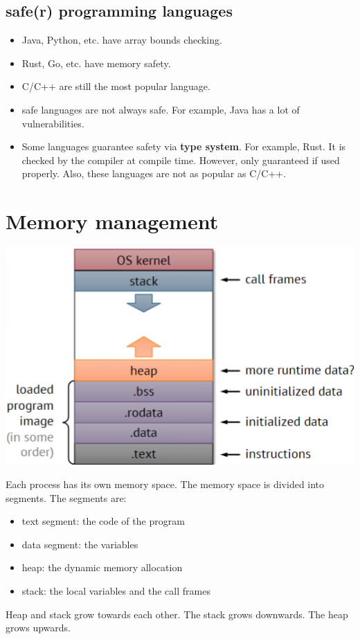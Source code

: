 \documentclass[letterpaper,12pt]{article}
\begin{document}
\subsection{safe(r) programming languages}
\begin{itemize}
    \item Java, Python, etc. have array bounds checking.
    \item Rust, Go, etc. have memory safety.
    \item C/C++ are still the most popular language.
    \item safe languages are not always safe. For example, Java has a lot of
          vulnerabilities.
    \item Some languages guarantee safety via \textbf{type system}. For example, Rust. It
          is checked by the compiler at compile time. However, only guaranteed if used
          properly. Also, these languages are not as popular as C/C++.
\end{itemize}
\section{Memory management}
\includegraphics*{./Images/Memory of a process.png}

Each process has its own memory space. The memory space is divided into
segments. The segments are: \begin{itemize}
    \item text segment: the code of the program
    \item data segment: the variables
    \item heap: the dynamic memory allocation
    \item stack: the local variables and the call frames
\end{itemize}
Heap and stack grow towards each other. The stack grows downwards. The heap grows upwards.
\end{document}
